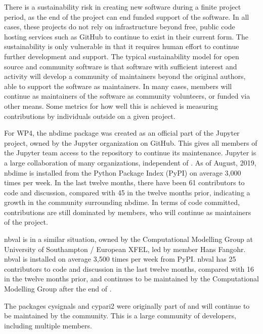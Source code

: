 \documentclass{deliverablereport}
\begin{document}
There is a sustainability risk in creating new software during a finite project period,
as the end of the project can end funded support of the software.
In all cases, these projects do not rely on infrastructure beyond free,
public code hosting services such as GitHub to continue to exist in their current form.
The sustainability is only vulnerable in that it requires human effort to continue further development and support.
The typical sustainability model for open source and community software
is that software with sufficient interest and activity will develop
a community of maintainers beyond the original authors,
able to support the software as maintainers.
In many cases, \ODK members will continue as maintainers of the software
as community volunteers, or funded via other means.
Some metrics for how well this is achieved is measuring contributions
by individuals outside \ODK on a given project.

For WP4, the nbdime package was created as an official part of the Jupyter project,
owned by the Jupyter organization on GitHub.
This gives all members of the Jupyter team access to the repository to continue its maintenance.
Jupyter is a large collaboration of many organizations, independent of \ODK.
As of August, 2019, nbdime is installed from the Python Package Index (PyPI) on average 3,000 times per week.
In the last twelve months, there have been 61 contributors to code and discussion, compared with 45 in the twelve months prior,
indicating a growth in the community surrounding nbdime.
In terms of code committed, contributions are still dominated by \ODK members,
who will continue as maintainers of the project.

nbval is in a similar situation,
owned by the Computational Modelling Group at University of Southampton / European XFEL,
led by \ODK member Hans Fangohr.
nbval is installed on average 3,500 times per week from PyPI.
nbval has 25 contributors to code and discussion in the last twelve months,
compared with 16 in the twelve months prior,
and continues to be maintained by the Computational Modelling Group after the end of \ODK.

The packages cysignals and cypari2 were originally part of \Sage
and will continue to be maintained by the \Sage community.
This is a large community of developers, including multiple \ODK members.

\end{document}
